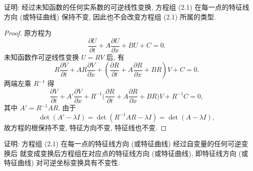 \begin{exercise}
  证明: 经过未知函数的任何实系数的可逆线性变换, 方程组 (2.1) 在每一点的特征线方向
  (或特征曲线) 保持不变, 因此也不会改变方程组 (2.1) 所属的类型.
\end{exercise}

\begin{proof}
  原方程为
  \[\frac{\partial U}{\partial t}+A\frac{\partial U}{\partial x}+BU+C = 0.\]
  未知函数作可逆线性变换 $U=RV$ 后, 有
  \[R\frac{\partial V}{\partial t}+AR\frac{\partial V}{\partial x}
    + \left(\frac{\partial R}{\partial t}+A\frac{\partial R}{\partial x}
    + BR\right)V + C = 0.\]
  两端左乘 $R^{-1}$ 得
  \[ \frac{\partial V}{\partial t} + A' \frac{\partial V}{\partial x}
      + R^{-1}\biggl(\frac{\partial R}{\partial t}
      + A \frac{\partial R}{\partial x} + BR\biggr)V + R^{-1}C = 0, \]
  其中 $A' = R^{-1}AR$. 由于
  \[\det(A'-\lambda I) = \det(R^{-1}AR - \lambda I)
    = \det(A - \lambda I),\]
  故方程的根保持不变, 特征方向不变, 特征线也不变.
\end{proof}


\begin{exercise}
  证明: 方程组 (2.1) 在每一点的特征线方向 (或特征曲线) 经过自变量的任何可逆变换后
  就变成变换后方程组在对应点的特征线方向 (或特征曲线), 即特征线方向 (或特征曲线)
  对可逆坐标变换具有不变性.
\end{exercise}
  
